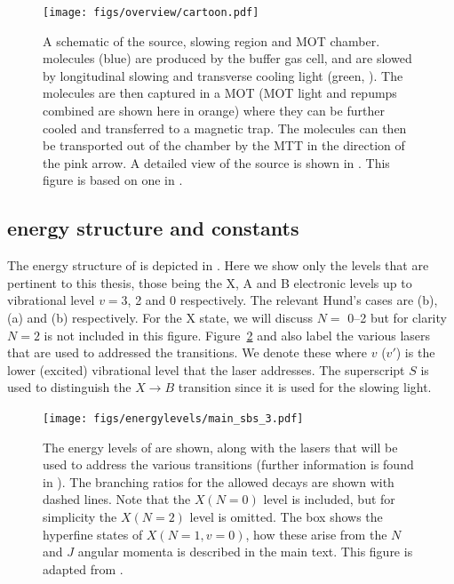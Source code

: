 \begin{figure}
  \centering
  \texttt{[image: figs/overview/cartoon.pdf]}
  \caption[\CaF{} source]{
    A schematic of the \CaF{} source, slowing region and MOT chamber.  \CaF{}
    molecules (blue) are produced by the buffer gas cell, and are slowed by
    longitudinal slowing and transverse cooling light (green, ).
    The molecules are then captured in a MOT (MOT light  and
    repumps combined are shown here in orange) where they can be further cooled
    and transferred to a magnetic trap. The molecules can then be transported
    out of the chamber by the MTT in the direction of the pink arrow. A
    detailed view of the source is shown in . This
    figure is based on one in .}
  \label{overview:fig:CaFcartoon}
\end{figure}

\subsection{\CaF{} energy structure and constants}

The energy structure of \CaF{} is depicted in
. Here we show only the levels that are
pertinent to this thesis, those being the X, A and B electronic levels up to
vibrational level $v=3$, 2 and 0 respectively. The relevant Hund's cases are
(b), (a) and (b) respectively. For the X state, we will discuss $N=$
\numrange{0}{2} but for clarity $N=2$ is not included in this figure.
%
Figure~\ref{overview:fig:CaFenergy} and  also
label the various lasers that are used to addressed the \CaF{} transitions. We
denote these  where $v$ ($v'$) is the lower (excited)
vibrational level that the laser addresses. The superscript $S$ is used to
distinguish the $X\rightarrow B$ transition since it is used for the slowing
light.

\begin{figure}
  \centering
  \texttt{[image: figs/energylevels/main\_sbs\_3.pdf]}
  \caption[The energy levels of \CaF{}]{
    The energy levels of \CaF{} are shown, along with the lasers that will be
    used to address the various transitions (further information is found in
    ). The branching ratios for the allowed
    decays are shown with dashed lines. Note that the $X(N=0)$ level is
    included, but for simplicity the $X(N=2)$ level is omitted. The box shows
    the hyperfine states of $X(N=1, v=0)$, how these arise from the $N$ and
    $J$ angular momenta is described in the main text. This figure is adapted
    from . 
  }
  \label{overview:fig:CaFenergy}
\end{figure}

